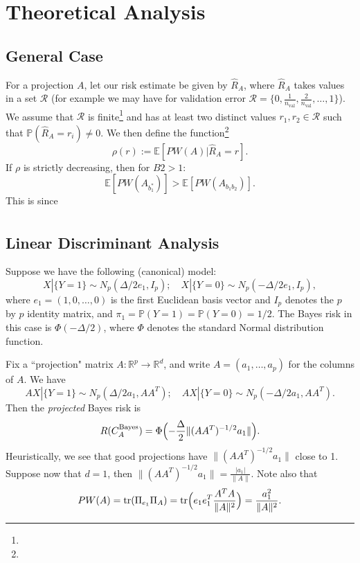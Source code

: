 \documentclass[12pt]{article}
\begin{document}
\section{Theoretical Analysis}
    


\citep{paulin_efronstein_2016}

\subsection{General Case}
For a projection $A$, let our risk estimate be given by $\hat{R}_A$, where $\hat{R}_A$ takes values in a set $\mathcal{R}$ (for example we may have for validation error $\mathcal{R} = \{0, \frac{1}{n_{\text{val}}}, \frac{2}{n_{\text{val}}}, \ldots, 1 \} $). We assume that $\mathcal{R}$ is finite\footnote{} and has at least two distinct values $r_1, r_2 \in \mathcal{R}$ such that $\mathbb{P}(\hat{R}_A = r_i) \neq 0$. We then define the function\footnote{} 
\[ \rho(r) := \mathbb{E}[PW(A) | \hat{R}_A = r]. \]
If $\rho$ is strictly decreasing, then for $B2 > 1$:
\[ \mathbb{E}[PW(A_{b_1^*})] > \mathbb{E}[PW(A_{b_1b_2})]. \]
This is since
\begin{align*}
    
\end{align*}



\subsection{Linear Discriminant Analysis}
Suppose we have the following (canonical) model:
\[
X | \{Y = 1\} \sim N_p(\Delta/2 e_1, I_p); \quad X | \{Y = 0\} \sim N_p(-\Delta/2 e_1, I_p),
\]
where $e_1 = (1, 0, \ldots, 0)$ is the first Euclidean basis vector and $I_p$ denotes the $p$ by $p$ identity matrix, and $\pi_1 = \mathbb{P}(Y=1) = \mathbb{P}(Y=0) = 1/2$. The Bayes risk in this case is $\Phi(-\Delta/2)$, where $\Phi$ denotes the standard Normal distribution function. 

Fix a ``projection" matrix $A: \mathbb{R}^p \rightarrow \mathbb{R}^d$, and write $A = (a_1, \ldots, a_p)$ for the columns of $A$. We have 
\[
AX | \{Y = 1\} \sim N_p(\Delta/2 a_1, AA^T); \quad AX | \{Y = 0\} \sim N_p(-\Delta/2 a_1, AA^T). 
\] 
Then the \emph{projected} Bayes risk is 
\[
R(C_{A}^{\mathrm{Bayes}}) = \Phi\Bigl(-\frac{\Delta}{2} \|(AA^T)^{-1/2} a_1 \| \Bigr).
\]
Heuristically, we see that good projections have $\|(AA^T)^{-1/2} a_1\|$ close to 1.  Suppose now that $d =1$, then $\|(AA^T)^{-1/2} a_1\| = \frac{|a_1|}{\|A\|}$. Note also that 
\[   
PW(A)   = \mathrm{tr}(\Pi_{e_1}\Pi_{A}) = \mathrm{tr}\Bigl(e_1e_1^T\frac{A^TA}{\|A\|^2}\Bigr)  =  \frac{a_1^2}{\|A\|^2}.
\]  
\end{document}
